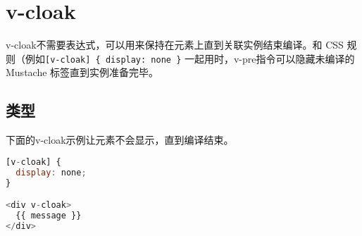 \begin{lstlisting}[language=JavaScript]

\end{lstlisting}




\begin{lstlisting}[language=JavaScript]

\end{lstlisting}




\begin{lstlisting}[language=JavaScript]

\end{lstlisting}




\begin{lstlisting}[language=JavaScript]

\end{lstlisting}




\begin{lstlisting}[language=JavaScript]

\end{lstlisting}




\begin{lstlisting}[language=JavaScript]

\end{lstlisting}




\begin{lstlisting}[language=JavaScript]

\end{lstlisting}

\chapter{v-cloak}

v-cloak不需要表达式，可以用来保持在元素上直到关联实例结束编译。和 CSS 规则（例如\texttt{[v-cloak] \{ display: none \}} 一起用时，v-pre指令可以隐藏未编译的 Mustache 标签直到实例准备完毕。


\section{类型}

下面的v-cloak示例让元素不会显示，直到编译结束。

\begin{lstlisting}[language=JavaScript]
[v-cloak] {
  display: none;
}

<div v-cloak>
  {{ message }}
</div>
\end{lstlisting}



